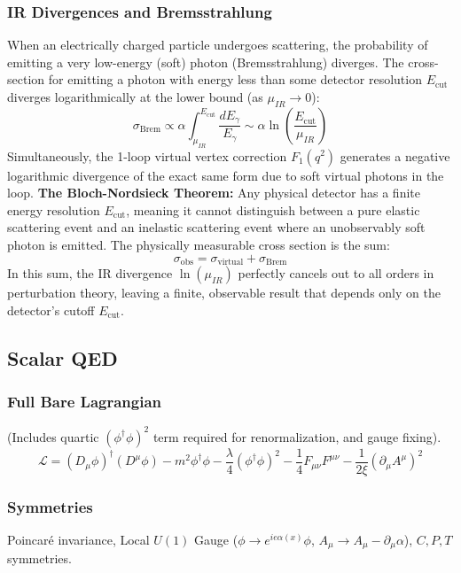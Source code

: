 \documentclass{article}
\begin{document}
\subsubsection*{IR Divergences and Bremsstrahlung}
When an electrically charged particle undergoes scattering, the probability of emitting a very low-energy (soft) photon (Bremsstrahlung) diverges. The cross-section for emitting a photon with energy less than some detector resolution $E_{\text{cut}}$ diverges logarithmically at the lower bound (as $\mu_{IR} \to 0$): 
\begin{equation}
    \sigma_{\text{Brem}} \propto \alpha \int_{\mu_{IR}}^{E_{\text{cut}}} \frac{dE_\gamma}{E_\gamma} \sim \alpha \ln\left(\frac{E_{\text{cut}}}{\mu_{IR}}\right)
\end{equation}
Simultaneously, the 1-loop virtual vertex correction $F_1(q^2)$ generates a negative logarithmic divergence of the exact same form due to soft virtual photons in the loop. 
\newline
\textbf{The Bloch-Nordsieck Theorem:} Any physical detector has a finite energy resolution $E_{\text{cut}}$, meaning it cannot distinguish between a pure elastic scattering event and an inelastic scattering event where an unobservably soft photon is emitted. The physically measurable cross section is the sum:
\begin{equation}
    \sigma_{\text{obs}} = \sigma_{\text{virtual}} + \sigma_{\text{Brem}}
\end{equation}
In this sum, the IR divergence $\ln(\mu_{IR})$ perfectly cancels out to all orders in perturbation theory, leaving a finite, observable result that depends only on the detector's cutoff $E_{\text{cut}}$.

\subsection{Scalar QED}
\subsubsection*{Full Bare Lagrangian}
(Includes quartic $(\phi^\dagger \phi)^2$ term required for renormalization, and gauge fixing).
\begin{equation}
    \mathcal{L} = (D_\mu \phi)^\dagger (D^\mu \phi) - m^2\phi^\dagger \phi - \frac{\lambda}{4}(\phi^\dagger \phi)^2 - \frac{1}{4}F_{\mu\nu}F^{\mu\nu} - \frac{1}{2\xi}(\partial_\mu A^\mu)^2
\end{equation}
\subsubsection*{Symmetries}
Poincar\'{e} invariance, Local $U(1)$ Gauge ($\phi \to e^{ie\alpha(x)}\phi$, $A_\mu \to A_\mu - \partial_\mu \alpha$), $C, P, T$ symmetries.
\end{document}
